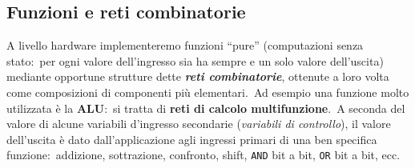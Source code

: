 \subsection{Funzioni e reti combinatorie}

A livello hardware implementeremo funzioni ``pure'' (computazioni senza stato:\ per ogni valore dell'ingresso sia ha sempre e un solo valore dell'uscita) mediante opportune strutture dette \textbf{\textit{reti combinatorie}}, ottenute a loro volta come composizioni di componenti più elementari.\
Ad esempio una funzione molto utilizzata è la \textbf{ALU}:\ si tratta di \textbf{reti di calcolo multifunzione}.\
A seconda del valore di alcune variabili d'ingresso secondarie (\textit{variabili di controllo}), il valore dell'uscita è dato dall'applicazione agli ingressi primari di una ben specifica funzione:\ addizione, sottrazione, confronto, shift, \texttt{AND} bit a bit, \texttt{OR} bit a bit, ecc.


